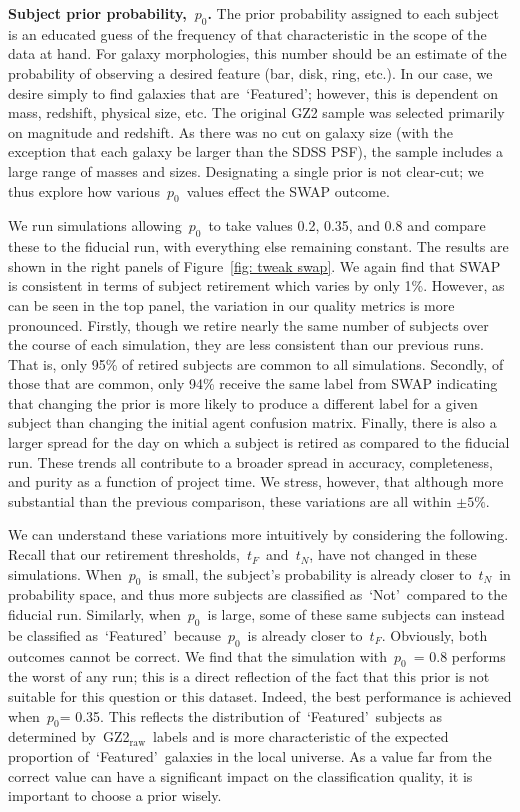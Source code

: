 \documentclass[twocolumn]{aastex6}
\newcommand{\p}{$p_0$}
\newcommand{\tf}{$t_F$}
\newcommand{\tn}{$t_N$}
\newcommand{\feat}{`Featured'}
\newcommand{\notfeat}{`Not'}
\newcommand{\raw}{GZ2$_{\text{raw}}$}
\begin{document}
\textbf{Subject prior probability,~\p.}
The prior probability assigned to each subject is an educated guess of 
the frequency of that characteristic in the scope of the data at hand. 
For galaxy morphologies, this number should be an estimate of the probability
of observing a desired feature (bar, disk, ring, etc.). In our case, 
we desire simply to find galaxies that are~\feat; however, this is dependent 
on mass, redshift, physical size, etc. The original GZ2 sample was selected
primarily on magnitude and redshift.  As there was no cut on galaxy size
(with the exception that each galaxy be larger than the SDSS PSF), the sample
includes a large range of  masses and sizes. Designating a single prior is not clear-cut; 
we thus explore how various~\p~values effect the SWAP outcome.

We run simulations allowing~\p~to take values 0.2, 0.35, and 0.8 
and compare these to the fiducial run, with everything else remaining constant.
The results are shown in the right panels of Figure~\ref{fig: tweak swap}. 
We again find that SWAP is consistent in terms of subject retirement which varies by only 1\%. 
However, as can be seen in the top panel, the variation in our quality metrics is 
more pronounced. 
Firstly, though we retire nearly the same number of subjects over the course
of each simulation, they are less consistent than our previous runs. That is, 
only 95\% of retired subjects are common to all simulations. Secondly, of those that are 
common, only 94\% receive the same label from SWAP indicating that changing the prior 
is more likely to produce a different label for a given subject than changing the initial 
agent confusion matrix. Finally, there is also a larger spread for the day on which a subject 
is retired as compared to the fiducial run. These trends all contribute to a broader 
spread in accuracy, completeness, and purity as a function of project time.
We stress, however, that although more substantial than the previous comparison, 
these variations are all within $\pm5\%$. 

We can understand these variations more intuitively by considering the following.
Recall that our retirement thresholds,~\tf~and~\tn, have not changed in these simulations. 
When~\p~is small, the subject's probability is already closer to~\tn~in probability space, 
and thus more subjects are classified as~\notfeat~compared to the fiducial run.
Similarly, when~\p~is large, some of these same subjects can instead be classified
as~\feat~because~\p~is already closer to~\tf. Obviously, both outcomes cannot be correct. 
We find that the simulation with~\p~= 0.8 performs the worst of any run; 
this is a direct reflection of the fact that this prior is not suitable for this question or this dataset. 
 Indeed, the best performance is achieved when~\p = 0.35.  This reflects the 
distribution of~\feat~subjects as determined by~\raw~labels and is more characteristic
of the expected proportion of~\feat~galaxies in the local universe.
As a value far from the correct value can have a significant impact on the classification
quality, it is important to choose a prior wisely.
 
\end{document}
